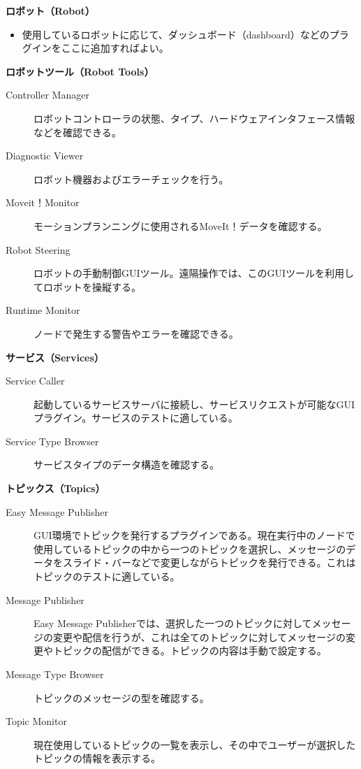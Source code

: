 \textbf{ロボット（Robot）}
\begin{itemize}
\item 使用しているロボットに応じて、ダッシュボード（dashboard）などのプラグインをここに追加すればよい。
\end{itemize}

\textbf{ロボットツール（Robot Tools）}
\begin{description}
\item  [Controller Manager] ロボットコントローラの状態、タイプ、ハードウェアインタフェース情報などを確認できる。
\item  [Diagnostic Viewer] ロボット機器およびエラーチェックを行う。
\item  [Moveit！Monitor] モーションプランニングに使用されるMoveIt！データを確認する。
\item  [Robot Steering] ロボットの手動制御GUIツール。遠隔操作では、このGUIツールを利用してロボットを操縦する。
\item  [Runtime Monitor] ノードで発生する警告やエラーを確認できる。
\end{description}

\textbf{サービス（Services）}
\begin{description}
\item  [Service Caller] 起動しているサービスサーバに接続し、サービスリクエストが可能なGUIプラグイン。サービスのテストに適している。
\item  [Service Type Browser] サービスタイプのデータ構造を確認する。
\end{description}

\textbf{トピックス（Topics）}
\begin{description}
\item  [Easy Message Publisher] GUI環境でトピックを発行するプラグインである。現在実行中のノードで使用しているトピックの中から一つのトピックを選択し、メッセージのデータをスライド・バーなどで変更しながらトピックを発行できる。これはトピックのテストに適している。
\item  [Message Publisher] Easy Message Publisherでは、選択した一つのトピックに対してメッセージの変更や配信を行うが、これは全てのトピックに対してメッセージの変更やトピックの配信ができる。トピックの内容は手動で設定する。
\item  [Message Type Browser] トピックのメッセージの型を確認する。
\item  [Topic Monitor] 現在使用しているトピックの一覧を表示し、その中でユーザーが選択したトピックの情報を表示する。
\end{description}

